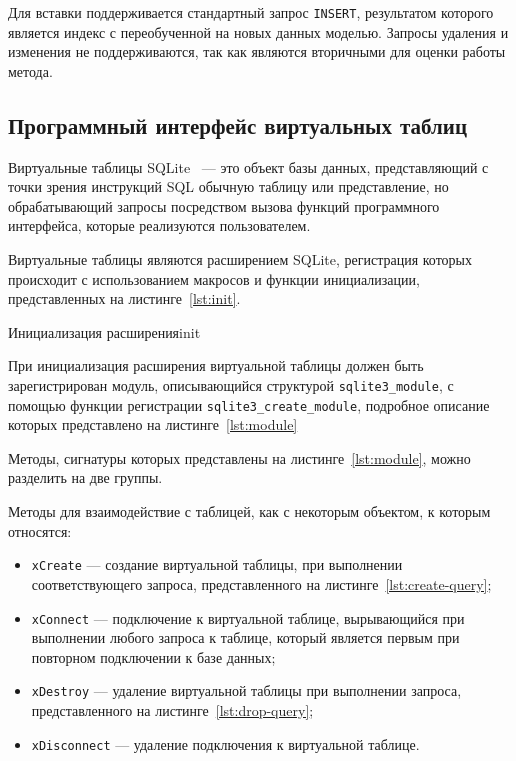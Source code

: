 Для вставки поддерживается стандартный запрос \texttt{INSERT}, результатом
которого является индекс с переобученной на новых данных моделью. Запросы
удаления и изменения не поддерживаются, так как являются вторичными для оценки
работы метода.

\subsection{Программный интерфейс виртуальных таблиц}

Виртуальные таблицы SQLite~\cite{vtable} --- это объект базы данных,
представляющий с точки зрения инструкций SQL обычную таблицу или представление,
но обрабатывающий запросы посредством вызова функций программного интерфейса,
которые реализуются пользователем.

Виртуальные таблицы являются расширением SQLite, регистрация которых происходит с
использованием макросов и функции инициализации, представленных на
листинге~\ref{lst:init}.

{}{Инициализация расширения}{init}{}

При инициализация расширения виртуальной таблицы должен быть зарегистрирован
модуль, описывающийся структурой \texttt{sqlite3\_module}, с помощью функции
регистрации \texttt{sqlite3\_create\_module}, подробное описание которых
представлено на листинге~\ref{lst:module}


Методы, сигнатуры которых представлены на листинге~\ref{lst:module}, можно
разделить на две группы.

Методы для взаимодействие с таблицей, как с некоторым объектом, к которым
относятся:
\begin{itemize}
    \item \texttt{xCreate} --- создание виртуальной таблицы, при
        выполнении соответствующего запроса, представленного на
        листинге~\ref{lst:create-query};
    \item \texttt{xConnect} --- подключение к виртуальной таблице,
        вырывающийся при выполнении любого запроса к таблице, который
        является первым при повторном подключении к базе данных;
    \item \texttt{xDestroy} --- удаление виртуальной таблицы при
        выполнении запроса, представленного на
        листинге~\ref{lst:drop-query};
    \item \texttt{xDisconnect} --- удаление подключения к виртуальной
        таблице.
\end{itemize}

